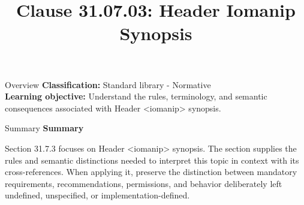 \documentclass[10pt,letterpaper]{article}
\title{Clause 31.07.03: Header Iomanip Synopsis}
\author{}
\date{}
\begin{document}
\maketitle
\begin{CornellOverviewBox}{Overview}
\textbf{Classification:} Standard library - Normative\\[2pt]
\textbf{Learning objective:} Understand the rules, terminology, and semantic consequences associated with Header <iomanip> synopsis.
\end{CornellOverviewBox}\begin{CornellSummaryBox}{Summary}
{\sffamily\bfseries\color{Accent} Summary}\par\vspace{3pt}Section 31.7.3 focuses on Header <iomanip> synopsis. The section supplies the rules and semantic distinctions needed to interpret this topic in context with its cross-references. When applying it, preserve the distinction between mandatory requirements, recommendations, permissions, and behavior deliberately left undefined, unspecified, or implementation-defined.
\end{CornellSummaryBox}
\end{document}
